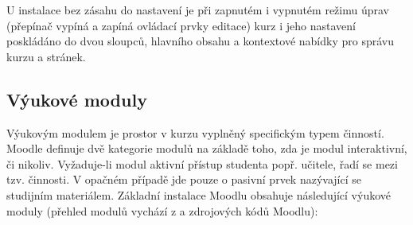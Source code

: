 \documentclass[
print,
  11pt,
  table,   
  nolof,    
  nolot,
  oneside,
  draft
]{fithesis3}
\begin{document}
U instalace bez zásahu do nastavení je při zapnutém i vypnutém režimu úprav (přepínač vypíná a zapíná ovládací prvky editace) kurz i jeho nastavení poskládáno do dvou sloupců, hlavního obsahu a kontextové nabídky pro správu kurzu a stránek.

		\subsection{Výukové moduly}
Výukovým modulem je prostor v kurzu vyplněný specifickým typem činností. Moodle definuje dvě kategorie modulů na základě toho, zda je modul interaktivní, či nikoliv. Vyžaduje-li modul aktivní přístup studenta popř. učitele, řadí se mezi tzv. činnosti. V opačném případě jde pouze o pasivní prvek nazývající se studijním materiálem.
Základní instalace Moodlu obsahuje následující výukové moduly (přehled modulů vychází z \cite{drlik} a zdrojových kódů Moodlu): 
\end{document}
